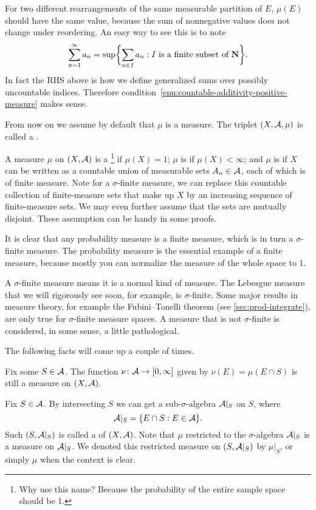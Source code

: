For two different rearrangements of the same measurable partition of $E$, $\mu(E)$ should have the same value, because the sum of nonnegative values does not change under reordering. An easy way to see this is to note \[
    \sum_{n=1}^\infty a_n= \sup\biggl\{\sum_{n\in I} a_n:I\text{ is a finite subset of }\mathbf{N}\biggr\}.
\] In fact the RHS above is how we define generalized sums over possibly uncountable indices. Therefore condition~\ref{enu:countable-additivity-positive-measure} makes sense.

From now on we assume by default that $\mu$ is a measure. The triplet $(X,\mathcal{A},\mu)$ is called a .

A measure $\mu$ on $(X,\mathcal{A})$ is a \footnote{Why use this name? Because the probability of the entire sample space should be 1.} if $\mu(X) = 1$; $\mu$ is  if $\mu(X) < \infty$; and $\mu$ is  if $X$ can be written as a countable union of measurable sets $A_n \in \mathcal{A}$, each of which is of finite measure. Note for a $\sigma$-finite measure, we can replace this countable collection of finite-measure sets that make up $X$ by an increasing sequence of finite-measure sets. We may even further assume that the sets are mutually disjoint. These assumption can be handy in some proofs.

It is clear that any probability measure is a finite measure, which is in turn a $\sigma$-finite measure. The probability measure is the essential example of a finite measure, because mostly you can normalize the measure of the whole space to $1$.

A $\sigma$-finite measure means it is a normal kind of measure. The Lebesgue measure that we will rigorously see soon, for example, is $\sigma$-finite. Some major results in measure theory, for example the Fubini--Tonelli theorem (see \cref{sec:prod-integrate}), are only true for $\sigma$-finite measure spaces. A measure that is not $\sigma$-finite is considered, in some sense, a little pathological.

The following facts will come up a couple of times.
\begin{fact} \label{fact:restrict-meausre-original-space}
    Fix some $S \in \mathcal{A}$. The function $\nu\colon \mathcal{A}\to [0,\infty]$ given by $\nu(E) = \mu(E \cap S)$ is still a measure on $(X,\mathcal{A})$.
\end{fact}
\begin{fact} \label{fact:restrict-meausre-restrict-space}
    Fix $S\in \mathcal{A}$. By intersecting $S$ we can get a sub-$\sigma$-algebra $\mathcal{A}|_S$ on $S$, where \[
        \mathcal{A}|_S = \{E \cap S: E\in\mathcal{A}\}.
    \] Such $(S,\mathcal{A}|_S)$ is called a  of $(X,\mathcal{A})$. Note that $\mu$ restricted to the $\sigma$-algebra $\mathcal{A}|_S$ is a measure on $\mathcal{A}|_S$. We denoted this restricted measure on $(S,\mathcal{A}|_S)$ by $\mu|_S$, or simply $\mu$ when the context is clear. 
\end{fact}

